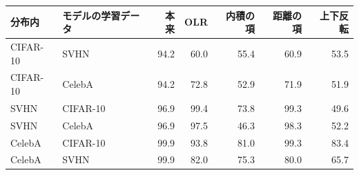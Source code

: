\documentclass[border=3pt]{standalone}
\begin{document}
%
\begin{tabular}{llrrrrr}%
\toprule
分布内 & モデルの学習データ & 本来 & OLR & 内積の項 & 距離の項 & 上下反転\\
\midrule
CIFAR-10 & SVHN & 94.2 & 60.0 & 55.4 & 60.9 & 53.5\\
CIFAR-10 & CelebA & 94.2 & 72.8 & 52.9 & 71.9 & 51.9\\
SVHN & CIFAR-10 & 96.9 & 99.4 & 73.8 & 99.3 & 49.6\\
SVHN & CelebA & 96.9 & 97.5 & 46.3 & 98.3 & 52.2\\
CelebA & CIFAR-10 & 99.9 & 93.8 & 81.0 & 99.3 & 83.4\\
CelebA & SVHN & 99.9 & 82.0 & 75.3 & 80.0 & 65.7\\
\bottomrule
\end{tabular}%
\end{document}
